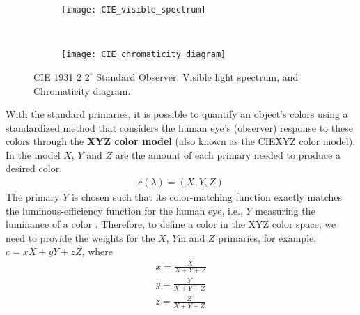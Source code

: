 \begin{figure}[!ht]
    \centering
    \begin{subfigure}[c]{0.65\textwidth}
        \texttt{[image: CIE\_visible\_spectrum]}
        \caption{}
        \label{fig:visual_spectrum}
    \end{subfigure}\\
    \begin{subfigure}[c]{0.65\textwidth}
        \texttt{[image: CIE\_chromaticity\_diagram]}
        \caption{}
        \label{fig:chrom_diagram}
    \end{subfigure} 
                      
    \caption{CIE 1931 2 $2^\circ$ Standard Observer:  Visible light spectrum, and  Chromaticity diagram.}\label{fig:cie_standard_observer}    
\end{figure}

With the standard primaries, it is possible to quantify an object's colors using a standardized method that considers the human eye's (observer) response to these colors through the \textbf{XYZ color model} (also known as the CIEXYZ color model). In the model $X$, $Y$ and $Z$ are the amount of each primary needed to produce a desired color.
\begin{eqnarray} 
 c(\lambda) = (X,Y,Z) \label{eq:XYZ_color}
\end{eqnarray}
The primary $Y$ is chosen such that its color-matching function exactly matches the luminous-efficiency function for the human eye, i.e., $Y$ measuring the luminance of a color \citep{Wright:BookCh2:2007}. Therefore, to define a color in the  XYZ color space, we need to provide the weights for the $X$, $Y$m and $Z$ primaries, for example, $c =xX + yY + zZ$, where 
\begin{gather} 
	x = \frac{X}{X+Y+Z} \nonumber \\ 
	y = \frac{Y}{X+Y+Z} \label{eq:xyz_color_coords} \\ 
	z = \frac{Z}{X+Y+Z} \nonumber 
\end{gather}

